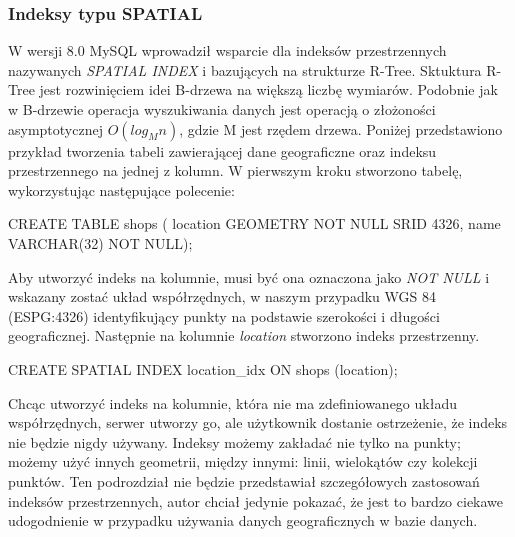 \subsubsection{Indeksy typu SPATIAL}
W wersji 8.0 MySQL wprowadził wsparcie dla indeksów przestrzennych nazywanych \textit{SPATIAL INDEX} i bazujących na strukturze R-Tree. Sktuktura R-Tree jest rozwinięciem idei B-drzewa na większą liczbę wymiarów. Podobnie jak w B-drzewie operacja wyszukiwania danych jest operacją o złożoności asymptotycznej $O(log_M n)$, gdzie M jest rzędem drzewa. Poniżej przedstawiono przykład tworzenia tabeli zawierającej dane geograficzne oraz indeksu przestrzennego na jednej z kolumn.
W pierwszym kroku stworzono tabelę, wykorzystując następujące polecenie:
\begin{spverbatim}
	CREATE TABLE shops (
	location GEOMETRY NOT NULL SRID 4326,
	name VARCHAR(32) NOT NULL);
\end{spverbatim}
Aby utworzyć indeks na kolumnie, musi być ona oznaczona jako \textit{NOT NULL} i wskazany zostać układ współrzędnych, w naszym przypadku WGS 84 (ESPG:4326) identyfikujący punkty na podstawie szerokości i długości geograficznej. Następnie na kolumnie \textit{location} stworzono indeks przestrzenny.
\begin{spverbatim}
	CREATE SPATIAL INDEX location_idx ON shops (location);
\end{spverbatim}
Chcąc utworzyć indeks na kolumnie, która nie ma zdefiniowanego układu współrzędnych, serwer utworzy go, ale użytkownik dostanie ostrzeżenie, że indeks nie będzie nigdy używany. Indeksy możemy zakładać nie tylko na punkty; możemy użyć innych geometrii, między innymi: linii, wielokątów czy kolekcji punktów. Ten podrozdział nie będzie przedstawiał szczegółowych zastosowań indeksów przestrzennych, autor chciał jedynie pokazać, że jest to bardzo ciekawe udogodnienie w przypadku używania danych geograficznych w bazie danych.

